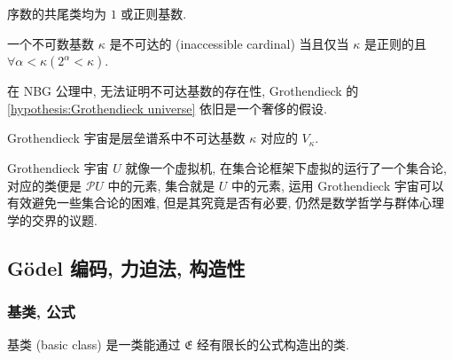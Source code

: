 \begin{corollary}
    序数的共尾类均为 \(1\) 或正则基数.
\end{corollary}

\begin{definition}
    \label {definition:inaccessible cardinal}
    一个不可数基数 \(\kappa\) 是不可达的 (inaccessible cardinal) 当且仅当 \(\kappa\) 是正则的且 \(\forall \alpha < \kappa (2^\alpha < \kappa)\).
\end{definition}

在 NBG 公理中, 无法证明不可达基数的存在性, Grothendieck 的 \ref{hypothesis:Grothendieck universe} 依旧是一个奢侈的假设.

\begin{theorem}
    Grothendieck 宇宙是层垒谱系中不可达基数 \(\kappa\) 对应的 \(V_\kappa\).
\end{theorem}

Grothendieck 宇宙 \(U\) 就像一个虚拟机, 在集合论框架下虚拟的运行了一个集合论, 对应的类便是 \(\mathcal{P} U\) 中的元素, 集合就是 \(U\) 中的元素,
运用 Grothendieck 宇宙可以有效避免一些集合论的困难, 但是其究竟是否有必要, 仍然是数学哲学与群体心理学的交界的议题.

\subsection{Gödel 编码, 力迫法, 构造性}

\subsubsection{基类, 公式}

\begin{definition}
    基类 (basic class) 是一类能通过 \(\mathfrak{E}\) 经有限长的公式构造出的类.
\end{definition}

